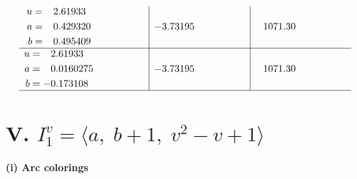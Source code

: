 \documentclass[1p]{elsarticle_modified}
\theoremstyle{definition}
\begin{document}
$$\begin{array}{c|c|c}
\begin{aligned}
u &= \phantom{-}2.61933\phantom{ +0.000000I} \\
a &= \phantom{-}0.429320\phantom{ +0.000000I} \\
b &= \phantom{-}0.495409\phantom{ +0.000000I}\end{aligned}
 & -3.73195\phantom{ +0.000000I} & \phantom{-}1071.30\phantom{ +0.000000I} \\ \hline\begin{aligned}
u &= \phantom{-}2.61933\phantom{ +0.000000I} \\
a &= \phantom{-}0.0160275\phantom{ +0.000000I} \\
b &= -0.173108\phantom{ +0.000000I}\end{aligned}
 & -3.73195\phantom{ +0.000000I} & \phantom{-}1071.30\phantom{ +0.000000I}\\
 \hline 
 \end{array}$$\newpage\newpage\renewcommand{\arraystretch}{1}
\centering \section*{V. $I^v_{1}= \langle a,\;b+1,\;v^2- v+1 \rangle$}
\flushleft \textbf{(i) Arc colorings}\\
\end{document}
